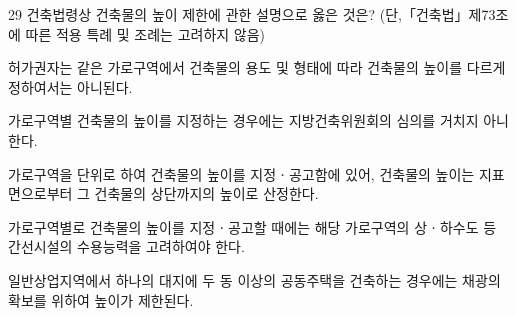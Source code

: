 \begin{question}{29}
건축법령상 건축물의 높이 제한에 관한 설명으로 옳은 것은? (단,「건축법」제73조에 따른 적용 특례 및 조례는 고려하지 않음)
\begin{choices}
  \item 허가권자는 같은 가로구역에서 건축물의 용도 및 형태에 따라 건축물의 높이를 다르게 정하여서는 아니된다.
  \item 가로구역별 건축물의 높이를 지정하는 경우에는 지방건축위원회의 심의를 거치지 아니한다.
  \item 가로구역을 단위로 하여 건축물의 높이를 지정ㆍ공고함에 있어, 건축물의 높이는 지표면으로부터 그 건축물의 상단까지의 높이로 산정한다.
  \item 가로구역별로 건축물의 높이를 지정ㆍ공고할 때에는 해당 가로구역의 상ㆍ하수도 등 간선시설의 수용능력을 고려하여야 한다.
  \item 일반상업지역에서 하나의 대지에 두 동 이상의 공동주택을 건축하는 경우에는 채광의 확보를 위하여 높이가 제한된다.
\end{choices}
\end{question}
